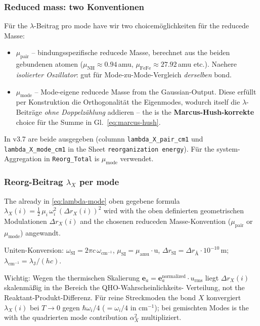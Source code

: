 \documentclass[11pt,a4paper,twoside]{article}
\theoremstyle{remark}
\begin{document}
\subsubsection*{Reduced mass: two Konventionen}

F\"ur the $\lambda$-Beitrag pro mode have wir two choicem\"oglichkeiten
f\"ur the reducede Masse:

\begin{itemize}
  \item $\mu_\text{pair}$ -- bindungsspezifische reducede Masse,
        berechnet aus the beiden gebundenen atomen
        ($\mu_\text{NH} \approx 0.94$\,amu,
        $\mu_\text{FeFe} \approx 27.92$\,amu etc.). Naehere
        \emph{isolierter Oszillator}: gut f\"ur Mode-zu-Mode-Vergleich
        \emph{derselben} bond.

  \item $\mu_\text{mode}$ -- Mode-eigene reducede Masse from the
        Gaussian-Output. Diese erf\"ullt per Konstruktion die
        Orthogonalit\"at the Eigenmodes, wodurch itself die
        $\lambda$-Beitr\"age \emph{ohne Doppelz\"ahlung}
        addieren -- the is the \textbf{Marcus-Hush-korrekte} choice
        f\"ur the Summe in Gl.~\ref{eq:marcus-hush}.
\end{itemize}

In v3.7 are beide ausgegeben (columnn \texttt{lambda\_X\_pair\_cm1}
und \texttt{lambda\_X\_mode\_cm1} in the Sheet
\texttt{reorganization energy}). F\"ur the system-Aggregation in
\texttt{Reorg\_Total} is $\mu_\text{mode}$ verwendet.

\subsubsection*{Reorg-Beitrag $\lambda_X$ per mode}

The already in \eqref{eq:lambda-mode} oben gegebene formula
$\lambda_X(i) = \tfrac{1}{2}\,\mu_i\,\omega_i^2\,(\Delta r_X(i))^2$
wird with the oben definierten geometrischen Modulationen
$\Delta r_X(i)$ and the chosenen reduceden Masse-Konvention
($\mu_\text{pair}$ or $\mu_\text{mode}$) angewandt.

Uniten-Konversion: $\omega_\text{SI} = 2\pi c\,\omega_{\text{cm}^{-1}}$,
$\mu_\text{SI} = \mu_{\text{amu}} \cdot \text{u}$,
$\Delta r_\text{SI} = \Delta r_{\text{\AA}} \cdot 10^{-10}$\,m;
$\lambda_{\text{cm}^{-1}} = \lambda_\text{J} / (h c)$.

Wichtig: Wegen the thermischen Skalierung
$\mathbf{e}_a = \mathbf{e}_a^\text{normalized} \cdot u_\text{rms}$
liegt $\Delta r_X(i)$ skalenm\"a{\ss}ig in the Bereich the QHO-Wahrscheinlichkeits-
Verteilung, not the Reaktant-Produkt-Differenz. F\"ur reine
Streckmoden the bond $X$ konvergiert $\lambda_X(i)$ bei $T \to 0$
gegen $\hbar\omega_i/4$ ($= \omega_i/4$ in cm$^{-1}$); bei gemischten
Modes is the with the quadrierten mode contribution $\alpha_X^2$ multipliziert.
\end{document}
